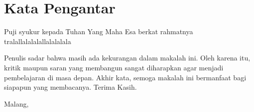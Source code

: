 \chapter*{Kata Pengantar}

Puji syukur kepada Tuhan Yang Maha Esa berkat rahmatnya tralallalalalallalalalala

Penulis sadar bahwa masih ada kekurangan dalam makalah ini.
Oleh karena itu, kritik maupun saran yang membangun sangat diharapkan agar menjadi pembelajaran di masa depan.
Akhir kata, semoga makalah ini bermanfaat bagi siapapun yang membacanya. Terima Kasih.

\begin{flushright}
    \vspace{1cm}
    Malang, \AdvanceDate[-2]{\today{}} \\
    \vspace{2cm}
    \theauthor
\end{flushright}

